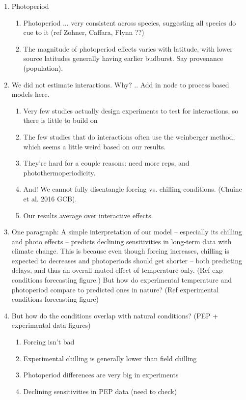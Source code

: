 \documentclass[11pt,letter]{article}
\begin{document}
\begin{enumerate}

\item Photoperiod
\begin{enumerate}
\item Photoperiod ... very consistent across species, suggesting all species do cue to it (ref Zohner, Caffara, Flynn ??)
\item The magnitude of photoperiod effects varies with latitude, with lower source latitudes generally having earlier budburst. Say provenance (population). 
\end{enumerate}

\item We did not estimate interactions. Why? ..  Add in node to process based models here. 

\begin{enumerate}
\item Very few studies actually design experiments to test for interactions, so there is little to build on
\item The few studies that do interactions often use the weinberger method, which seems a little weird based on our results.
\item They're hard for a couple reasons: need more reps, and photothermoperiodicity.
\item And! We cannot fully disentangle forcing vs. chilling conditions. (Chuine et al. 2016 GCB).
\item Our results average over interactive effects. 
\end{enumerate}

\item One paragraph: A simple interpretation of our model -- especially its chilling and photo effects -- predicts declining sensitivities in long-term data with climate change. This is because even though forcing increases, chilling is expected to decreases and photoperiods should get shorter -- both predicting delays, and thus an overall muted effect of temperature-only.  (Ref exp conditions forecasting figure.) But how do experimental temperature and photoperiod compare to predicted ones in nature? (Ref experimental conditions forecasting figure)

\item But how do the conditions overlap with natural conditions? (PEP + experimental data figures)
\begin{enumerate}
\item Forcing isn't bad
\item Experimental chilling is generally lower than field chilling
\item Photoperiod differences are very big in experiments
\item Declining sensitivities in PEP data (need to check)
\end{enumerate}


\end{enumerate}
\end{document}
